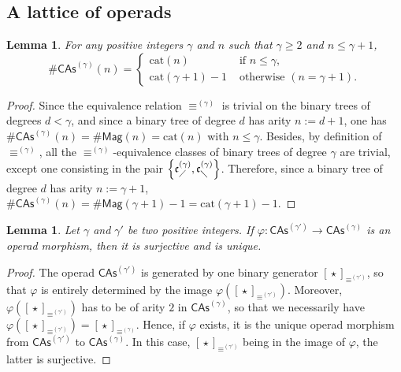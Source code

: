 \documentclass[10pt,reqno]{amsart}
\numberwithin{equation}{subsection}
\newtheorem{Lemma}[Theorem]{Lemma}
\renewcommand{\leq}{\leqslant}
\renewcommand{\geq}{\geqslant}
\newcommand{\Mag}{\mathsf{Mag}}
\newcommand{\CAs}[1]{\mathsf{CAs}^{(#1)}}
\newcommand{\LComb}[1]{\mathfrak{c}^{(#1)}_{\diagup}}
\newcommand{\RComb}[1]{\mathfrak{c}^{(#1)}_{\diagdown}}
\newcommand{\Catalan}{\mathrm{cat}}
\DeclareMathOperator{\Product}{\star}
\DeclareMathOperator{\Congr}{\equiv}
\newcommand{\CongrCAs}[1]{\Congr^{(#1)}}
\begin{document}
\subsection{A lattice of operads}

\begin{Lemma} \label{lem:first_dimensions_CAs}
    For any positive integers $\gamma$ and $n$ such that $\gamma \geq 2$
    and $n \leq \gamma + 1$,
    \begin{equation}
        \# \CAs{\gamma}(n) =
        \begin{cases}
            \Catalan(n)
                & \mbox{ if } n \leq \gamma, \\
            \Catalan(\gamma + 1) - 1
                & \mbox{ otherwise } (n = \gamma + 1).
        \end{cases}
    \end{equation}
\end{Lemma}
\begin{proof}
    Since the equivalence relation $\CongrCAs{\gamma}$ is trivial on the
    binary trees of degrees $d < \gamma$, and since a binary tree of
    degree $d$ has arity $n := d + 1$, one has
    $\# \CAs{\gamma}(n) = \# \Mag(n) = \Catalan(n)$ with $n \leq \gamma$.
    Besides, by definition of $\CongrCAs{\gamma}$, all the
    $\CongrCAs{\gamma}$-equivalence classes of binary trees of degree
    $\gamma$ are trivial, except one consisting in the pair
    $\left\{\LComb{\gamma}, \RComb{\gamma}\right\}$. Therefore, since a
    binary tree of degree $d$ has arity $n := \gamma + 1$,
    \begin{math}
        \# \CAs{\gamma}(n)
        = \# \Mag(\gamma + 1) - 1
        = \Catalan(\gamma + 1) - 1.
    \end{math}
\end{proof}
\medbreak

\begin{Lemma} \label{lem:surjective_morphisms_CAs}
    Let $\gamma$ and $\gamma'$ be two positive integers. If
    $\varphi:\CAs{\gamma'} \to \CAs{\gamma}$ is an operad morphism, then
    it is surjective and is unique.
\end{Lemma}
\begin{proof}
    The operad $\CAs{\gamma'}$ is generated by one binary generator
    $[\Product]_{\CongrCAs{\gamma'}}$, so that $\varphi$ is entirely
    determined by the image
    $\varphi\left([\Product]_{\CongrCAs{\gamma'}}\right)$. Moreover,
    $\varphi([\Product]_{\CongrCAs{\gamma'}})$ has to be of arity $2$ in
    $\CAs{\gamma}$, so that we necessarily have
    \begin{math}
        \varphi\left([\Product]_{\CongrCAs{\gamma'}}\right)
        =
        [\Product]_{\CongrCAs{\gamma}}.
    \end{math}
    Hence, if $\varphi$ exists, it is the unique operad morphism from
    $\CAs{\gamma'}$ to $\CAs{\gamma}$. In this case,
    $[\Product]_{\CongrCAs{\gamma'}}$ being in the image of $\varphi$,
    the latter is surjective.
\end{proof}
\medbreak
\end{document}
